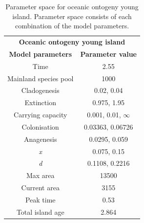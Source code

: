 \begin{table}[ht]
    \centering
    \caption{Parameter space for oceanic ontogeny young island. Parameter space consists of each combination of the model parameters.}
    \begin{tabular}{ c | c }
        \multicolumn{2}{c}{\textbf{Oceanic ontogeny young island}} \\
        \textbf{Model parameters} & \textbf{Parameter value} \\ 
        \hline
        \hline
        Time & 2.55 \\
        \hline
        Mainland species pool & 1000 \\
        \hline
        Cladogenesis & 0.02, 0.04 \\
        \hline
        Extinction & 0.975, 1.95 \\
        \hline
        Carrying capacity & 0.001, 0.01, $\infty$ \\
        \hline
        Colonisation & 0.03363, 0.06726 \\
        \hline
        Anagenesis & 0.0295, 0.059 \\
        \hline
        \textit{x} & 0.075, 0.15 \\
        \hline
        \textit{d} & 0.1108, 0.2216 \\
        \hline
        Max area & 13500 \\
        \hline
        Current area & 3155 \\
        \hline
        Peak time & 0.53 \\
        \hline
        Total island age & 2.864 \\
    \end{tabular}
    \label{tab:oceanic_ontogeny_young}
\end{table}


